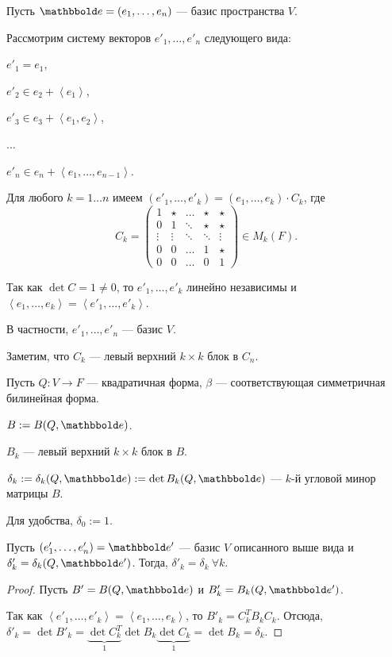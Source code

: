 Пусть $\E = (e_1, \dots, e_n)$ --- базис пространства $V$.

Рассмотрим систему векторов $e'_1, \dots, e'_n$ следующего вида:

$e'_1 = e_1$,

$e'_2 \in e_2 + \left< e_1 \right>$,

$e'_3 \in e_3 + \left< e_1, e_2 \right>$,

$\dots$

$e'_n \in e_n + \left< e_1, \dots, e_{n - 1} \right>$.

Для любого $k = 1 \dots n$ имеем $(e'_1, \dots, e'_k) = (e_1, \dots, e_k) \cdot C_k$, где
\begin{equation*}
    C_k = \begin{pmatrix} 
        1 & \star & \dots & \star & \star \\
        0 & 1 & \ddots & \star & \star \\
        \vdots & \vdots & \ddots & \ddots & \vdots \\
        0 & 0 & \dots & 1 & \star \\
        0 & 0 & \dots & 0 & 1
    \end{pmatrix} \in M_k(F)
.\end{equation*}

Так как $\det C = 1 \neq 0$, то $e'_1, \dots, e'_k$ линейно независимы и $\left< e_1, \dots, e_k \right> = \left< e'_1, \dots, e'_k \right>$.

В частности, $e'_1, \dots, e'_n$ --- базис $V$.

Заметим, что $C_k$ --- левый верхний $k \times k$ блок в $C_n$.

Пусть $Q \colon V \to F$ --- квадратичная форма, $\beta$ --- соответствующая симметричная билинейная форма.

$B := B(Q, \E)$.

$B_k$ --- левый верхний $k \times k$ блок в $B$.

$\delta_k := \delta_k(Q, \E) := \det B_k(Q, \E)$ --- $k$-й угловой минор матрицы $B$.

Для удобства, $\delta_0 := 1$.

\begin{lemma}
    Пусть $(e'_1, \dots, e'_n) = \E'$ --- базис $V$ описанного выше вида и $\delta'_k = \delta_k(Q, \E')$. Тогда, $\delta'_k = \delta_k \ \forall k$.
\end{lemma}

\begin{proof}
    Пусть $B' = B(Q, \E)$ и $B'_k = B_k(Q, \E')$.

    Так как $\left< e'_1, \dots, e'_k \right> = \left< e_1, \dots, e_k \right>$, то $B'_k = C_k^T B_k C_k$.
    Отсюда, $\delta'_k = \det B'_k = \underbrace{\det C_k^T}_1 \det B_k \underbrace{\det C_k}_1 = \det B_k = \delta_k$.
\end{proof}



